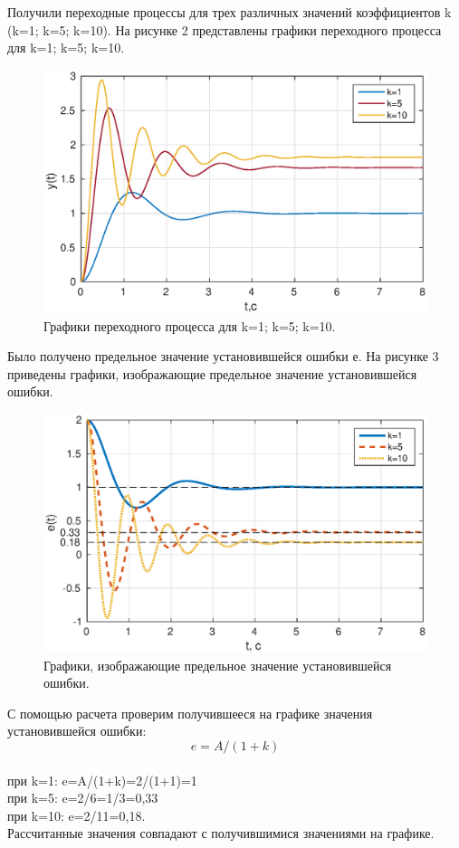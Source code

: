\documentclass[a4paper,14pt]{article}
\begin{document}
Получили переходные процессы для трех различных значений коэффициентов k (k=1; k=5; k=10).
На рисунке 2 представлены графики переходного процесса для k=1; k=5; k=10.
\begin{figure}[H]
\centering
\includegraphics[width=\textwidth]{1/1_1y(t).eps}
\caption{Графики переходного процесса для k=1; k=5; k=10.}
\end{figure}

Было получено предельное значение установившейся ошибки е. На рисунке 3 приведены графики, изображающие предельное значение установившейся ошибки. 
\begin{figure}[H]
\centering
\includegraphics[width=\textwidth]{1/1_1e.eps}
\caption{Графики, изображающие предельное значение установившейся ошибки.}
\end{figure}

С помощью расчета проверим получившееся на графике значения установившейся ошибки:
\begin{equation}
e=A/(1+k)
\end{equation}
\\при k=1: e=A/(1+k)=2/(1+1)=1
\\при k=5: e=2/6=1/3=0,33
\\при k=10: e=2/11=0,18.
\\Рассчитанные значения совпадают с получившимися значениями на графике.
\end{document}
